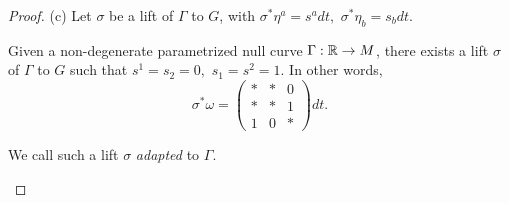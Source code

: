 \begin{proof}
\mn(c)  Let $\sigma$ be a lift of $\Gamma$ to $G$, with 
$\sigma^*\eta^a=s^adt, $ $\sigma^*\eta_b=s_bdt.$ 

\begin{lemma}\label{adapted} Given a non-degenerate parametrized null curve $\Gamma:\mathbb{R}\to M$, there exists a lift $\sigma$ of $\Gamma$ to $G$ such that  $s^1=s_2=0,$ $s_1=s^2=1$. In other words, 
$$\sigma^*\omega=%
\left(\begin{array}{ccc} *&*&0\\ *&*&1\\ 1&0&*\end{array}\right)dt.
$$
\end{lemma}
 
\begin{rmrk} We call such a lift $\sigma$ {\em adapted} to $\Gamma$.  
\end{rmrk}
 

\end{proof}

